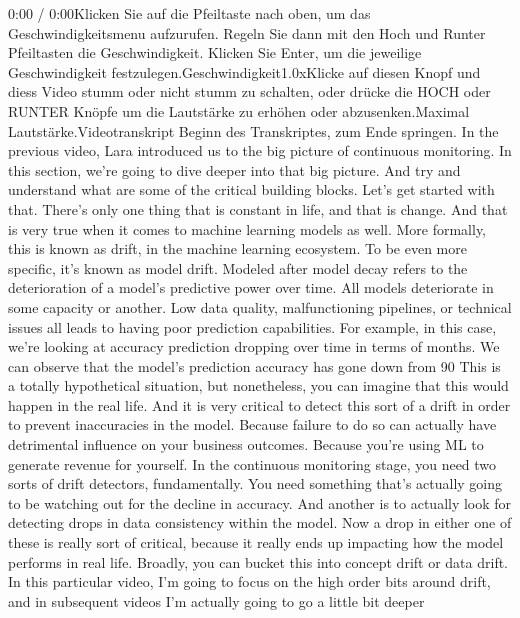 {{{{{{{{    0:00 / 0:00Klicken Sie auf die Pfeiltaste nach oben, um das Geschwindigkeitsmenu aufzurufen. Regeln Sie dann mit den Hoch und Runter Pfeiltasten die Geschwindigkeit. Klicken Sie Enter, um die jeweilige Geschwindigkeit festzulegen.Geschwindigkeit1.0xKlicke auf diesen Knopf und diess Video stumm oder nicht stumm zu schalten, oder drücke die HOCH oder RUNTER Knöpfe um die Lautstärke zu erhöhen oder abzusenken.Maximal Lautstärke.Videotranskript
    Beginn des Transkriptes, zum Ende springen.
    In the previous video, Lara introduced us
    to the big picture of continuous monitoring.
    In this section, we're going to dive deeper into that big picture.
    And try and understand what are some of the critical building blocks.
    Let's get started with that.
    There's only one thing that is constant in life, and that is change.
    And that is very true when it comes to machine learning models as well.
    More formally, this is known as drift, in the machine learning ecosystem.
    To be even more specific, it's known as model drift.
    Modeled after model decay refers to the deterioration
    of a model's predictive power over time.
    All models deteriorate in some capacity or another.
    Low data quality, malfunctioning pipelines, or technical issues all
    leads to having poor prediction capabilities.
    For example, in this case, we're looking at accuracy prediction
    dropping over time in terms of months.
    We can observe that the model's prediction accuracy has gone down
    from 90%
    This is a totally hypothetical situation,
    but nonetheless, you can imagine that this would happen in the real life.
    And it is very critical to detect this sort of a drift
    in order to prevent inaccuracies in the model.
    Because failure to do so can actually have detrimental influence
    on your business outcomes.
    Because you're using ML to generate revenue for yourself.
    In the continuous monitoring stage, you need two sorts of drift detectors,
    fundamentally.
    You need something that's actually going to be watching out
    for the decline in accuracy.
    And another is to actually look for detecting drops in data consistency
    within the model.
    Now a drop in either one of these is really sort of critical,
    because it really ends up impacting how the model performs in real life.
    Broadly, you can bucket this into concept drift or data drift.
    In this particular video, I'm going to focus on the high order
    bits around drift, and in subsequent videos
    I'm actually going to go a little bit deeper
}}}}}}}}
